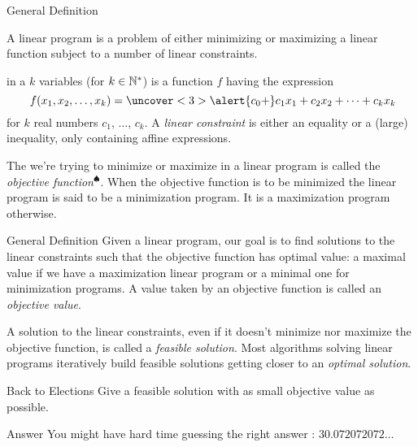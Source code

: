 \documentclass[32pt, aspectratio = 169]{beamer}
\begin{document}
\begin{frame}{General Definition}
\begin{defn}
  A linear program is a problem of either minimizing or maximizing a
  linear function subject to a number of linear constraints.
\end{defn}
 in a $k$ variables (for $k \in \mathbb{N}^*$) is a function $f$
having the expression
    \[
\        f(x_1, x_2, \ldots, x_k) = \uncover<3>{\alert{c_0 + }} c_1x_1 + c_2x_2 + \cdots + c_kx_k
    \]
    for $k$ real numbers $c_1$, $\ldots$, $c_k$. A \emph{linear
      constraint} is either an equality or a (large) inequality, only
    containing affine expressions.

    \pause
    The  we're trying to minimize or maximize in a linear
    program is called the \emph{objective
      function}$^{\spadesuit}$. When the objective function is to be
    minimized the linear program is said to be a minimization
    program. It is a maximization program otherwise.
\end{frame}

\begin{frame}{General Definition}
  Given a linear program, our goal is to find solutions to the linear
  constraints such that the objective function has optimal value: a
  maximal value if we have a maximization linear program or a minimal
  one for minimization programs. A value taken by an objective
  function is called an \emph{objective value}.

  \pause
  A solution to the linear constraints, even if it doesn't minimize
  nor maximize the objective function, is called a \emph{feasible
    solution}. Most algorithms solving linear programs iteratively
  build feasible solutions getting closer to an \emph{optimal
    solution}.
  \pause
    \begin{halfshyblock}{Back to Elections}
        Give a feasible solution with as small objective value as possible.
    \end{halfshyblock}
    \pause
    \begin{alertblock}{Answer}
      You might have hard time guessing the right answer : $30.072072072\ldots$
    \end{alertblock}
\end{frame}
\end{document}
